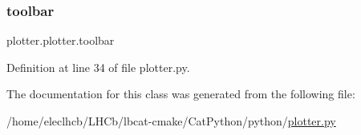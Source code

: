 \subsubsection{\texorpdfstring{toolbar}{toolbar}}
{\footnotesize\ttfamily plotter.\+plotter.\+toolbar}



Definition at line 34 of file plotter.\+py.



The documentation for this class was generated from the following file\+:\begin{DoxyCompactItemize}
\item 
/home/eleclhcb/\+L\+H\+Cb/lbcat-\/cmake/\+Cat\+Python/python/\hyperlink{plotter_8py}{plotter.\+py}\end{DoxyCompactItemize}
